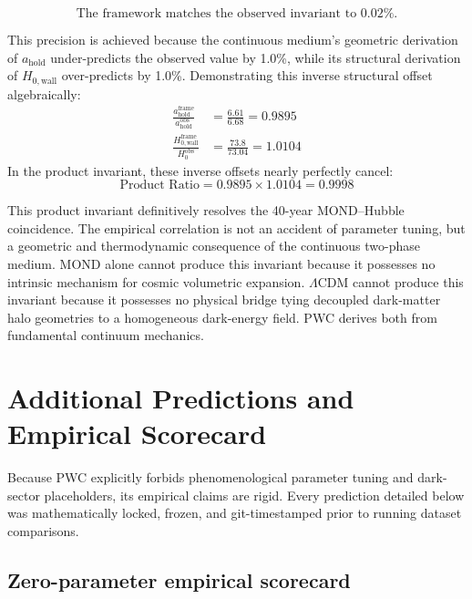 \documentclass[aps,prd,twocolumn,superscriptaddress,amsmath,amssymb,nofootinbib,floatfix]{revtex4-2}
\newcommand{\amax}{a_{\text{hold}}}
\newcommand{\Hwall}{H_{0,\text{wall}}}
\begin{document}
\begin{equation}
\boxed{\text{The framework matches the observed invariant to 0.02\%.}}
\end{equation}

This precision is achieved because the continuous medium's geometric derivation of $\amax$ under-predicts the observed value by 1.0\%, while its structural derivation of $\Hwall$ over-predicts by 1.0\%. Demonstrating this inverse structural offset algebraically:
\begin{align}
\frac{\amax^{\text{frame}}}{\amax^{\text{obs}}} &= \frac{6.61}{6.68} = 0.9895 \\
\frac{\Hwall^{\text{frame}}}{H_0^{\text{obs}}} &= \frac{73.8}{73.04} = 1.0104
\end{align}
In the product invariant, these inverse offsets nearly perfectly cancel:
\begin{equation}
\text{Product Ratio} = 0.9895 \times 1.0104 = 0.9998
\end{equation}

This product invariant definitively resolves the 40-year MOND--Hubble coincidence. The empirical correlation is not an accident of parameter tuning, but a geometric and thermodynamic consequence of the continuous two-phase medium. MOND alone cannot produce this invariant because it possesses no intrinsic mechanism for cosmic volumetric expansion. $\Lambda$CDM cannot produce this invariant because it possesses no physical bridge tying decoupled dark-matter halo geometries to a homogeneous dark-energy field. PWC derives both from fundamental continuum mechanics.

\section{Additional Predictions and Empirical Scorecard}
\label{sec:scorecard}

Because PWC explicitly forbids phenomenological parameter tuning and dark-sector placeholders, its empirical claims are rigid. Every prediction detailed below was mathematically locked, frozen, and git-timestamped prior to running dataset comparisons.

\subsection{Zero-parameter empirical scorecard}
\label{ssec:scorecard-table}
\end{document}
